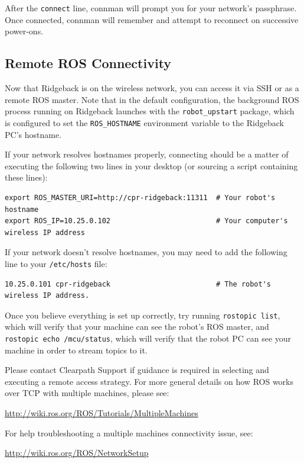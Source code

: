 \documentclass[]{clearpath-latex/clearpath-manual}
\begin{document}
After the \lstinline{connect} line, connman will prompt you for your network's passphrase. Once connected, connman will remember and attempt to reconnect on successive power-ons.

\subsection{Remote ROS Connectivity}

Now that Ridgeback is on the wireless network, you can access it via SSH or as a remote ROS master. Note that in the default configuration, the background ROS process running on Ridgeback launches with the \lstinline{robot_upstart} package, which is configured to set the \lstinline{ROS_HOSTNAME} environment variable to the Ridgeback PC's hostname.

If your network resolves hostnames properly, connecting should be a matter of executing the following two lines in your desktop (or sourcing a script containing these lines):

\begin{lstlisting}
export ROS_MASTER_URI=http://cpr-ridgeback:11311  # Your robot's hostname
export ROS_IP=10.25.0.102                         # Your computer's wireless IP address
\end{lstlisting}

If your network doesn't resolve hostnames, you may need to add the following line to your \lstinline{/etc/hosts} file:

\begin{lstlisting}
10.25.0.101 cpr-ridgeback                         # The robot's wireless IP address.
\end{lstlisting}

Once you believe everything is set up correctly, try running \lstinline{rostopic list}, which will verify that your machine can see the robot's ROS master, and \lstinline{rostopic echo /mcu/status}, which will verify that the robot PC can see your machine in order to stream topics to it.

Please contact Clearpath Support if guidance is required in selecting and executing a remote access strategy.
For more general details on how ROS works over TCP with multiple machines, please see:

\url{http://wiki.ros.org/ROS/Tutorials/MultipleMachines}

For help troubleshooting a multiple machines connectivity issue, see:

\url{http://wiki.ros.org/ROS/NetworkSetup}
\end{document}
